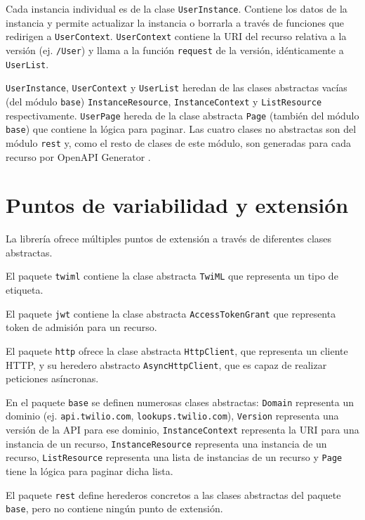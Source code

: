 \documentclass{article}
\begin{document}
Cada instancia individual es de la clase \verb|UserInstance|.
Contiene los datos de la instancia
y permite actualizar la instancia o borrarla
a través de funciones que redirigen a \verb|UserContext|.
\verb|UserContext| contiene la URI del recurso relativa a la versión
(ej. \verb|/User|)
y llama a la función \verb|request| de la versión,
idénticamente a \verb|UserList|.

\verb|UserInstance|, \verb|UserContext| y \verb|UserList|
heredan de las clases abstractas vacías
(del módulo \verb|base|)
\verb|InstanceResource|, \verb|InstanceContext| y \verb|ListResource|
respectivamente.
\verb|UserPage| hereda de la clase abstracta
\verb|Page| (también del módulo \verb|base|)
que contiene la lógica para paginar.
Las cuatro clases no abstractas son del módulo \verb|rest|
y, como el resto de clases de este módulo,
son generadas para cada recurso por OpenAPI Generator
\cite{twilio-generated-openapi}.


\section{Puntos de variabilidad y extensión}

La librería ofrece múltiples puntos de extensión
a través de diferentes clases abstractas.

El paquete \verb|twiml| contiene la clase abstracta \verb|TwiML|
que representa un tipo de etiqueta.

El paquete \verb|jwt| contiene la clase abstracta \verb|AccessTokenGrant|
que representa token de admisión para un recurso.

El paquete \verb|http| ofrece la clase abstracta
\verb|HttpClient|, que representa un cliente HTTP,
y su heredero abstracto \verb|AsyncHttpClient|,
que es capaz de realizar peticiones asíncronas.

En el paquete \verb|base| se definen numerosas clases abstractas:
\verb|Domain| representa un dominio
(ej. \verb|api.twilio.com|, \verb|lookups.twilio.com|),
\verb|Version| representa una versión de la API para ese dominio,
\verb|InstanceContext| representa la URI para una instancia de un recurso,
\verb|InstanceResource| representa una instancia de un recurso,
\verb|ListResource| representa una lista de instancias de un recurso
y \verb|Page| tiene la lógica para paginar dicha lista.

El paquete \verb|rest| define herederos concretos a las clases abstractas
del paquete \verb|base|, pero no contiene ningún punto de extensión.
\end{document}

